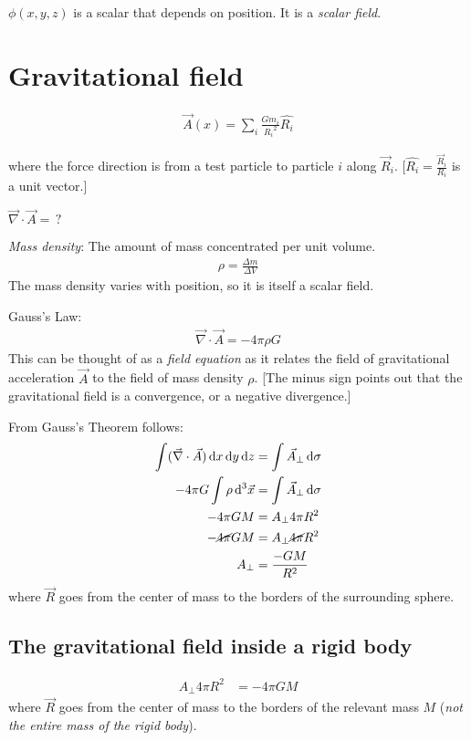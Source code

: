 \documentclass[pagesize,headsepline,10pt,parskip=half,BCOR=12mm]{scrreprt}
\begin{document}
      $\phi(x, y, z)$ is a scalar that depends on position. It is a
      \emph{scalar field}.
    \section{Gravitational field}
      \begin{align*}
        \vec A(x) = \sum_i \frac{Gm_i}{{R_i}^2} \hat{R_i}
      \end{align*}

      where the force direction is from a test particle to particle
      $i$ along $\vec R_i$. [$\hat{R_i} = \frac{\vec R_i}{R_i}$ is
      a unit vector.]

      $\vec \nabla \cdot \vec A =\, ?$

      \emph{Mass density}: The amount of mass concentrated per unit
      volume.
      \begin{align}
        \rho = \frac{\Delta m}{\Delta V}
      \end{align}
      The mass density varies with position, so it is itself
      a scalar field.

      Gauss's Law:
      \begin{align}
        \vec \nabla \cdot \vec A = -4 \pi \rho G
      \end{align}
      This can be thought of as a \emph{field equation} as it
      relates the field of gravitational acceleration $\vec A$ to
      the field of mass density $\rho$. [The minus sign points out
      that the gravitational field is a convergence, or a negative
      divergence.]

      From Gauss's Theorem follows:
      \begin{align}
        \int (\vec \nabla \cdot \vec A)\,\mathrm{d}x\,\mathrm{d}y\,\mathrm{d}z &= \int
        \vec A_\perp\,\mathrm{d}\sigma\\
        -4 \pi G \int \rho\,\mathrm{d}^3\vec x &= \int \vec
        A_\perp\,\mathrm{d}\sigma\\
        -4 \pi G M &= A_\perp 4 \pi R^2\\
        -\cancel{4 \pi} G M &= A_\perp \cancel{4 \pi} R^2\\
        A_\perp &= \frac{-G M}{R^2}
      \end{align}
      where $\vec R$ goes from the center of mass to the
      borders of the surrounding sphere.

      \subsection{The gravitational field inside a rigid body}
        \begin{align}
          A_\perp 4 \pi R^2 &= -4 \pi G M
        \end{align}
        where $\vec R$ goes from the center of mass to the
        borders of the relevant mass $M$ (\emph{not the entire mass
        of the rigid body}).
\end{document}

